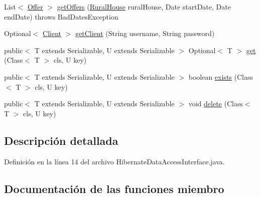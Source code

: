 \begin{DoxyCompactItemize}
\item 
List$<$ \mbox{\hyperlink{classcom_1_1ruralhousejsf_1_1domain_1_1_offer}{Offer}} $>$ \mbox{\hyperlink{interfacecom_1_1ruralhousejsf_1_1data_access_1_1_hibernate_data_access_interface_a2cc9a4e0968b6fde1773f03f3d1ea33c}{get\+Offers}} (\mbox{\hyperlink{classcom_1_1ruralhousejsf_1_1domain_1_1_rural_house}{Rural\+House}} rural\+House, Date start\+Date, Date end\+Date)  throws Bad\+Dates\+Exception
\item 
Optional$<$ \mbox{\hyperlink{classcom_1_1ruralhousejsf_1_1domain_1_1_client}{Client}} $>$ \mbox{\hyperlink{interfacecom_1_1ruralhousejsf_1_1data_access_1_1_hibernate_data_access_interface_abf581529aefd317dffd1d2ca0906c3ac}{get\+Client}} (String username, String password)
\item 
public$<$ T extends Serializable, U extends Serializable $>$ Optional$<$ T $>$ \mbox{\hyperlink{interfacecom_1_1ruralhousejsf_1_1data_access_1_1_hibernate_data_access_interface_a59446f9ebfa6acfa2315debdca84d360}{get}} (Class$<$ T $>$ cls, U key)
\item 
public$<$ T extends Serializable, U extends Serializable $>$ boolean \mbox{\hyperlink{interfacecom_1_1ruralhousejsf_1_1data_access_1_1_hibernate_data_access_interface_ac4fef50cac8142bfd12685d7fe48d926}{exists}} (Class$<$ T $>$ cls, U key)
\item 
public$<$ T extends Serializable, U extends Serializable $>$ void \mbox{\hyperlink{interfacecom_1_1ruralhousejsf_1_1data_access_1_1_hibernate_data_access_interface_a887957b637255d48878d157ee414027a}{delete}} (Class$<$ T $>$ cls, U key)
\end{DoxyCompactItemize}


\subsection{Descripción detallada}


Definición en la línea 14 del archivo Hibernate\+Data\+Access\+Interface.\+java.



\subsection{Documentación de las funciones miembro}
\mbox{\label{interfacecom_1_1ruralhousejsf_1_1data_access_1_1_hibernate_data_access_interface_a4671ad8ff75ef8a9195974dbdcd95e7f}} 
